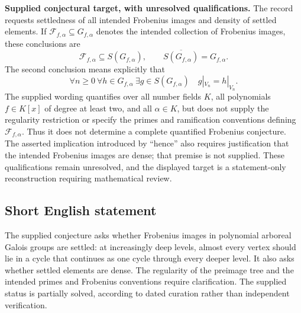 \documentclass[11pt]{article}
\begin{document}
\textbf{Supplied conjectural target, with unresolved qualifications.} The record requests settledness of all intended Frobenius images and density of settled elements. If \(\mathcal F_{f,\alpha}\subseteq G_{f,\alpha}\) denotes the intended collection of Frobenius images, these conclusions are
\[
\mathcal F_{f,\alpha}\subseteq S(G_{f,\alpha}),
\qquad
\overline{S(G_{f,\alpha})}=G_{f,\alpha}.
\]
The second conclusion means explicitly that
\[
\forall n\geq0\ \forall h\in G_{f,\alpha}\ \exists g\in S(G_{f,\alpha})
\quad g|_{V_n}=h|_{V_n}.
\]
The supplied wording quantifies over all number fields \(K\), all polynomials \(f\in K[x]\) of degree at least two, and all \(\alpha\in K\), but does not supply the regularity restriction or specify the primes and ramification conventions defining \(\mathcal F_{f,\alpha}\). Thus it does not determine a complete quantified Frobenius conjecture. The asserted implication introduced by ``hence'' also requires justification that the intended Frobenius images are dense; that premise is not supplied. These qualifications remain unresolved, and the displayed target is a statement-only reconstruction requiring mathematical review.
\subsection{Short English statement}
The supplied conjecture asks whether Frobenius images in polynomial arboreal Galois groups are settled: at increasingly deep levels, almost every vertex should lie in a cycle that continues as one cycle through every deeper level. It also asks whether settled elements are dense. The regularity of the preimage tree and the intended primes and Frobenius conventions require clarification. The supplied status is partially solved, according to dated curation rather than independent verification.
\end{document}
